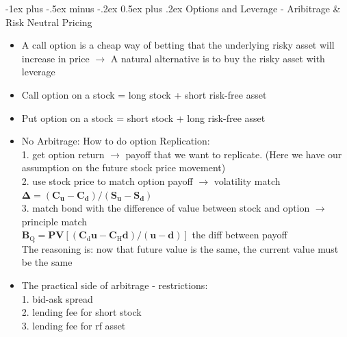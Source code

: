 \documentclass[10pt,landscape]{article}
\makeatletter
\renewcommand{\section}{\@startsection{section}{1}{0mm}%
                                {-1ex plus -.5ex minus -.2ex}%
                                {0.5ex plus .2ex}%
                                {\normalfont\large\bfseries}}
\makeatother
\begin{document}
    \begin{multicols}{2}
    \setlength{\premulticols}{1pt}
    \setlength{\postmulticols}{1pt}
    \setlength{\multicolsep}{1pt}
    \setlength{\columnsep}{2pt}

    \section{Options and Leverage - Aribitrage \& Risk Neutral Pricing}
    \begin{itemize}
        \item A call option is a cheap way of betting that the underlying risky asset will increase in price $\longrightarrow$ A natural alternative is to buy the risky asset with leverage
        \item Call option on a stock = long stock + short risk-free asset 
        \item Put option on a stock = short stock + long risk-free asset
        \item {\color{red}No Arbitrage:} How to do option Replication: \\
            1. get option return $\longrightarrow$ payoff that we want to replicate. (Here we have our assumption on the future stock price movement)\\
            2. use stock price to match option payoff $\longrightarrow$ volatility match\\
                $\boldsymbol{\Delta}=\left(\mathbf{C}_{\mathbf{u}}-\mathbf{C}_{\mathbf{d}}\right) /\left(\mathbf{S}_{\mathbf{u}}-\mathbf{S}_{\mathbf{d}}\right)$\\
            3. match bond with the difference of value between stock and option $\longrightarrow$ principle match\\
                $\mathbf{B}_{\mathrm{Q}}=\mathbf{P} \mathbf{V}\left[\left(\mathbf{C}_{\mathrm{d}} \mathbf{u}-\mathbf{C}_{\mathrm{H}} \mathbf{d}\right) /(\mathbf{u}-\mathbf{d})\right]$ the diff between payoff\\

                The reasoning is: now that future value is the same, the current value must be the same


        \item The practical side of arbitrage - restrictions:\\
            1. bid-ask spread\\
            2. lending fee for short stock\\
            3. lending fee for rf asset\\



\end{itemize}
\end{multicols}
\end{document}
